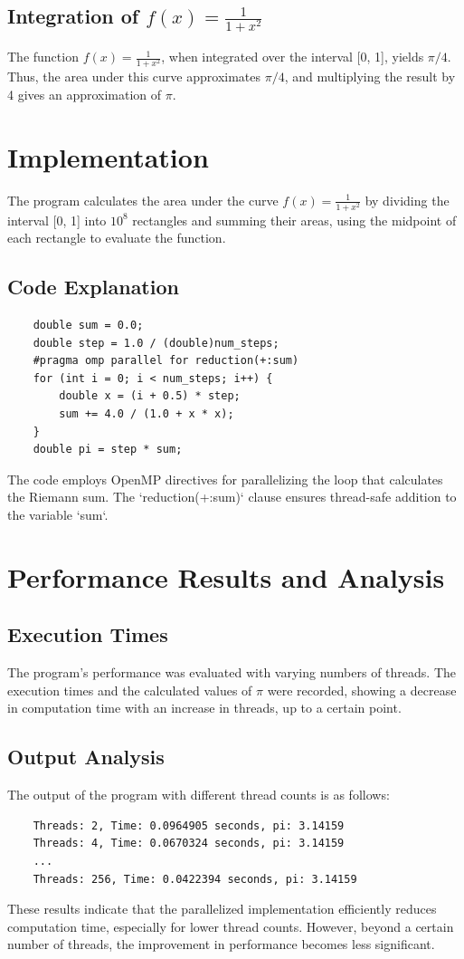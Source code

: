 \documentclass[11pt]{article}
\begin{document}
    \subsection{Integration of $f(x) = \frac{1}{1+x^2}$}
    The function $f(x) = \frac{1}{1+x^2}$, when integrated over the interval [0, 1], yields $\pi/4$. Thus, the area under this curve approximates $\pi/4$, and multiplying the result by 4 gives an approximation of $\pi$.

    \section{Implementation}
    The program calculates the area under the curve $f(x) = \frac{1}{1+x^2}$ by dividing the interval [0, 1] into $10^8$ rectangles and summing their areas, using the midpoint of each rectangle to evaluate the function. 

    \subsection{Code Explanation}
    \begin{verbatim}
    double sum = 0.0;
    double step = 1.0 / (double)num_steps;
    #pragma omp parallel for reduction(+:sum)
    for (int i = 0; i < num_steps; i++) {
        double x = (i + 0.5) * step;
        sum += 4.0 / (1.0 + x * x);
    }
    double pi = step * sum;
    \end{verbatim}
    The code employs OpenMP directives for parallelizing the loop that calculates the Riemann sum. The `reduction(+:sum)` clause ensures thread-safe addition to the variable `sum`.

    \section{Performance Results and Analysis}
    \subsection{Execution Times}
    The program's performance was evaluated with varying numbers of threads. The execution times and the calculated values of $\pi$ were recorded, showing a decrease in computation time with an increase in threads, up to a certain point.

    \subsection{Output Analysis}
    The output of the program with different thread counts is as follows:
    \begin{verbatim}
    Threads: 2, Time: 0.0964905 seconds, pi: 3.14159
    Threads: 4, Time: 0.0670324 seconds, pi: 3.14159
    ...
    Threads: 256, Time: 0.0422394 seconds, pi: 3.14159
    \end{verbatim}
    These results indicate that the parallelized implementation efficiently reduces computation time, especially for lower thread counts. However, beyond a certain number of threads, the improvement in performance becomes less significant.
\end{document}
